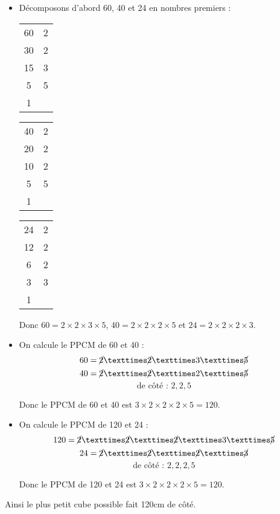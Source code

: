 \documentclass[a4paper]{article}
\begin{document}
\begin{itemize}
	\item Décomposons d'abord 60, 40 et 24 en nombres premiers :

	      \begin{tabular}{c|c}
		      60 & 2 \\
		      30 & 2 \\
		      15 & 3 \\
		      5  & 5 \\
		      1  &
	      \end{tabular} \hspace{2em}
	      \begin{tabular}{c|c}
		      40 & 2 \\
		      20 & 2 \\
		      10 & 2 \\
		      5  & 5 \\
		      1  &
	      \end{tabular} \hspace{2em}
	      \begin{tabular}{c|c}
		      24 & 2 \\
		      12 & 2 \\
		      6  & 2 \\
		      3  & 3 \\
		      1  &
	      \end{tabular}

	      Donc $60 = 2×2×3×5$, $40 = 2×2×2×5$ et $24 = 2×2×2×3$.
	\item On calcule le PPCM de 60 et 40 :
	      $$ 60 = \cancel{2}×\cancel{2}×3×\cancel{5} $$
	      $$ 40 = \cancel{2}×\cancel{2}×2×\cancel{5} $$
	      $$ \text{de côté : } 2, 2, 5 $$

	      Donc le PPCM de 60 et 40 est $3×2×2×2×5 = 120$.
	\item On calcule le PPCM de 120 et 24 :
	      $$ 120 = \cancel{2}×\cancel{2}×\cancel{2}×3×\cancel{5} $$
	      $$ 24 = \cancel{2}×\cancel{2}×\cancel{2}×\cancel{3} $$
	      $$ \text{de côté : } 2, 2, 2, 5 $$

	      Donc le PPCM de 120 et 24 est $3×2×2×2×5 = 120$.
\end{itemize}

Ainsi le plus petit cube possible fait 120cm de côté.
\end{document}

